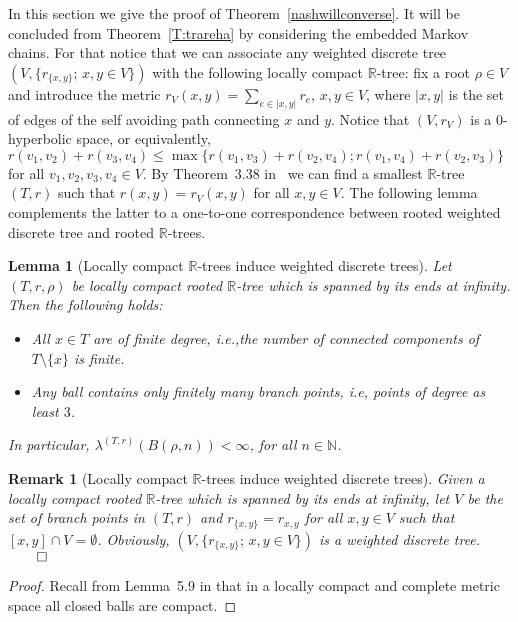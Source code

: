 \documentclass[11pt]{amsart}
\numberwithin{equation}{section}
\newtheorem{lemma}[definition]{Lemma}
\newtheorem{remark}[definition]{Remark}
\begin{document}
{In this section we give the proof of Theorem~\ref{nashwillconverse}. It will be concluded from Theorem~\ref{T:trareha} by considering
the embedded Markov chains.  For that notice that we can associate any weighted discrete tree $(V,\{r_{\{x,y\}};\,x,y\in V\})$
with the following locally compact ${{\mathbb R}}$-tree:  fix a root $\rho\in V$ and introduce the metric
$r_V(x,y)=\sum_{e\in |x,y|}r_e$, $x,y\in V$, where $|x,y|$ is the set of
edges of the self avoiding path connecting $x$ and $y$. Notice that $(V,r_V)$ is a $0$-hyperbolic space, or equivalently,  $r(v_1,v_2)+r(v_3,v_4)\le\max\{r(v_1,v_3)+r(v_2,v_4);r(v_1,v_4)+r(v_2,v_3)\}$ for all $v_1,v_2,v_3,v_4\in V$.
By Theorem~3.38 in~\cite{Eva} we can find a smallest ${{\mathbb R}}$-tree $(T,r)$
such that $r(x,y)=r_V(x,y)$ for all $x,y\in V$. The following lemma complements the latter to a  one-to-one correspondence between
rooted weighted discrete tree and rooted ${{\mathbb R}}$-trees.

\begin{lemma}[Locally compact ${{\mathbb R}}$-trees induce weighted discrete trees]
Let $(T,r,\rho)$ be locally compact rooted ${{\mathbb R}}$-tree which is spanned by its ends at infinity.
Then the following holds:
\begin{itemize}
\item[(i)] All $x\in T$ are of finite degree, i.e.,the number of
connected components of $T\setminus\{x\}$ is finite.
\item[(ii)] Any ball contains only finitely many branch points, i.e, points of degree as least $3$.
\end{itemize}
\label{L:061}

In particular, $\lambda^{(T,r)}(B(\rho,n))<\infty$, for all $n\in{{\mathbb N}}$.
\end{lemma}{\smallskip}

\begin{remark}[Locally compact ${{\mathbb R}}$-trees induce weighted discrete trees]\rm
Given a locally compact rooted ${{\mathbb R}}$-tree which is spanned by its ends at infinity, let $V$ be the set of branch points in $(T,r)$ and $r_{\{x,y\}}=r_{x,y}$
\label{Rem:02}
for all $x,y\in V$ such that $[x,y]\cap V=\emptyset$. Obviously, $(V,\{r_{\{x,y\}};\,x,y\in V\})$ is a weighted discrete tree.
\hfill$\qed$
\end{remark}{\smallskip}

\begin{proof} Recall from  Lemma~5.9 in \cite{Kigami95}
that in a locally compact and complete
metric space all closed balls are compact.


\end{proof}}
\end{document}
